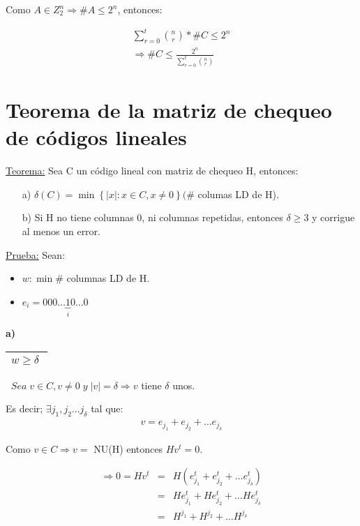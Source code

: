 \documentclass[12pt,a4paper]{report}
\newcounter{neq}
\begin{document}
		Como $A \in Z_{2}^{n} \Rightarrow \# A \leq 2^{n}$, entonces:

		\begin{eqnarray}
			\nonumber \sum_{r = 0}^{t} {n \choose r} * \# C \leq 2^{n} \\
			\nonumber \Rightarrow \# C \leq \frac{2^{n}}{\sum_{r = 0}^{t} {n \choose r}}
		\end{eqnarray}

	\section{Teorema de la matriz de chequeo de códigos lineales}

		\underline{Teorema:} Sea C un código lineal con matriz de chequeo H, entonces:
		\begin{itemize}
			\item[a)] $\delta(C) = \min \left\lbrace \lvert x \rvert : x \in C , x \neq 0 \right\rbrace (\#$ columas LD de H).
			\item[b)] Si H no tiene columnas 0, ni columnas repetidas, entonces $\delta \geq 3$ y corrigue al menos un error.
		\end{itemize}

		\underline{Prueba:} Sean:
		\begin{itemize}
			\item $w : \min \#$ columnas LD de H.
			\item $e_{i} = 000 \dotsc \underbrace{1}_{i} 0 \dotsc 0$
		\end{itemize}

		\textbf{a)} \begin{tabular}{|c|} \hline $w \geq \delta \; $ \\ \hline \end{tabular} $ \; \; Sea \; v \in C , v \neq 0 \; y \; \lvert v \rvert = \delta \Rightarrow v$ tiene $\delta$ unos.

		\vspace{3mm}
		Es decir; $\exists j_{1}, j_{2} \dotsc j_{\delta}$ tal que:
		\begin{eqnarray}
			\nonumber v = e_{j_{1}} + e_{j_{2}} + \dotsc e_{j_{\delta}}
		\end{eqnarray}

		Como $ v \in C \Rightarrow v =$ NU(H) entonces $Hv^{t} = 0$.

		\begin{eqnarray}
			\nonumber \Rightarrow 0 = Hv^{t} &=& H(e_{j_{1}}^{t} + e_{j_{2}}^{t} + \dotsc e_{j_{\delta}}^{t}) \\
			\nonumber &=& H e_{j_{1}}^{t} + H e_{j_{2}}^{t} + \dotsc H e_{j_{\delta}}^{t} \\
			\nonumber &=& H^{j_{1}} + H^{j_{2}} + \dotsc H^{j_{\delta}}
		\end{eqnarray}
\end{document}
